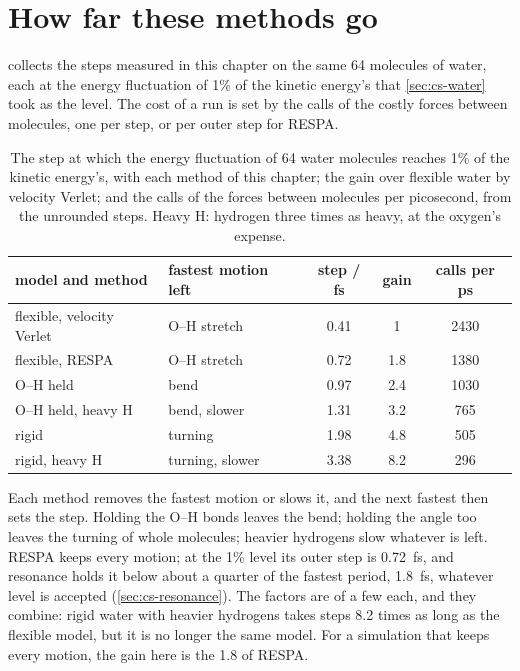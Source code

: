 \section{How far these methods go}
\label{sec:cs-limits}

 collects the steps measured in this chapter on the
same 64 molecules of water, each at the energy fluctuation of 1\% of the
kinetic energy's that \cref{sec:cs-water} took as the level. The cost of
a run is set by the calls of the costly forces between molecules, one per
step, or per outer step for RESPA.

\begin{table}[htb]
\centering
\caption{The step at which the energy fluctuation of 64 water molecules
reaches 1\% of the kinetic energy's, with each method of this chapter;
the gain over flexible water by velocity Verlet; and the calls of the
forces between molecules per picosecond, from the unrounded steps. Heavy H: hydrogen three times as
heavy, at the oxygen's expense.}
\label{tab:cs-steps}
\begin{tabular}{llccc}
\toprule
model and method & fastest motion left & step / fs & gain & calls per ps\\
\midrule
flexible, velocity Verlet & O--H stretch & 0.41 & 1 & 2430\\
flexible, RESPA & O--H stretch & 0.72 & 1.8 & 1380\\
O--H held & bend & 0.97 & 2.4 & 1030\\
O--H held, heavy H & bend, slower & 1.31 & 3.2 & 765\\
rigid & turning & 1.98 & 4.8 & 505\\
rigid, heavy H & turning, slower & 3.38 & 8.2 & 296\\
\bottomrule
\end{tabular}
\end{table}

Each method removes the fastest motion or slows it, and the next fastest
then sets the step. Holding the O--H bonds leaves the bend; holding the
angle too leaves the turning of whole molecules; heavier hydrogens slow
whatever is left. RESPA keeps every motion; at the 1\% level its outer
step is \SI{0.72}{\femto\second}, and resonance holds it below about a
quarter of the fastest period, \SI{1.8}{\femto\second}, whatever level is
accepted (\cref{sec:cs-resonance}). The factors are of a few each, and they
combine: rigid water with heavier hydrogens takes steps 8.2 times as long
as the flexible model, but it is no longer the same model. For a
simulation that keeps every motion, the gain here is the 1.8 of RESPA.

